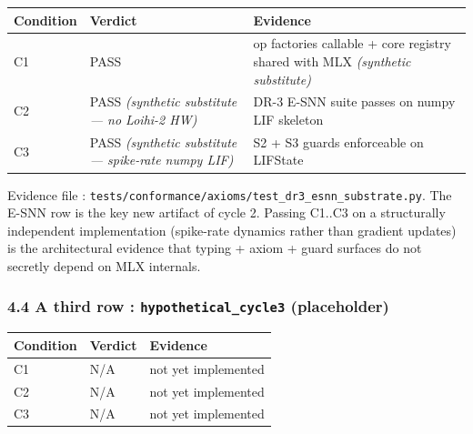 \documentclass[
]{article}
\newcounter{none} %
\begin{document}
{\def\LTcaptype{none} %
\begin{longtable}[]{@{}
  >{\raggedright\arraybackslash}p{}
  >{\raggedright\arraybackslash}p{}
  >{\raggedright\arraybackslash}p{}@{}}
\toprule\noalign{}
\begin{minipage}[b]{\linewidth}\raggedright
Condition
\end{minipage} & \begin{minipage}[b]{\linewidth}\raggedright
Verdict
\end{minipage} & \begin{minipage}[b]{\linewidth}\raggedright
Evidence
\end{minipage} \\
\midrule\noalign{}
\endhead
\bottomrule\noalign{}
\endlastfoot
C1 & PASS & 4 op factories callable + core registry shared with MLX
\emph{(synthetic substitute)} \\
C2 & PASS \emph{(synthetic substitute --- no Loihi-2 HW)} & DR-3 E-SNN
suite passes on numpy LIF skeleton \\
C3 & PASS \emph{(synthetic substitute --- spike-rate numpy LIF)} & S2 +
S3 guards enforceable on LIFState \\
\end{longtable}
}

Evidence file :
\texttt{tests/conformance/axioms/test\_dr3\_esnn\_substrate.py}. The
E-SNN row is the key new artifact of cycle 2. Passing C1..C3 on a
structurally independent implementation (spike-rate dynamics rather than
gradient updates) is the architectural evidence that typing + axiom +
guard surfaces do not secretly depend on MLX internals.

\subsubsection{\texorpdfstring{4.4 A third row :
\texttt{hypothetical\_cycle3}
(placeholder)}{4.4 A third row : hypothetical\_cycle3 (placeholder)}}\label{a-third-row-hypothetical_cycle3-placeholder}

{\def\LTcaptype{none} %
\begin{longtable}[]{@{}lll@{}}
\toprule\noalign{}
Condition & Verdict & Evidence \\
\midrule\noalign{}
\endhead
\bottomrule\noalign{}
\endlastfoot
C1 & N/A & not yet implemented \\
C2 & N/A & not yet implemented \\
C3 & N/A & not yet implemented \\
\end{longtable}
}
\end{document}
